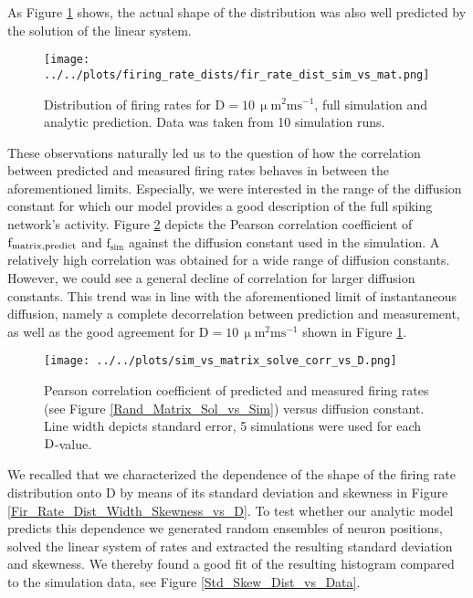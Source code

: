 \documentclass[10pt,a4paper]{article}
\begin{document}
As Figure \ref{Fir_Rate_Dist_Sim_vs_Mat} shows, the actual shape of the distribution was also well predicted by the solution of the linear system.
\begin{figure}
\begin{center}
\texttt{[image: ../../plots/firing\_rate\_dists/fir\_rate\_dist\_sim\_vs\_mat.png]}
\end{center}
\caption[Distribution of firing rates, full simulation and analytic prediction]{Distribution of firing rates for $\mathrm{D=10\, \upmu m^2 ms^{-1}}$, full simulation and analytic prediction. Data was taken from 10 simulation runs.}
\label{Fir_Rate_Dist_Sim_vs_Mat}
\end{figure}
These observations naturally led us to the question of how the correlation between predicted and measured firing rates behaves in between the aforementioned limits. Especially, we were interested in the range of the diffusion constant for which our model provides a good description of the full spiking network's activity. Figure \ref{Corr_Coeff_vs_D} depicts the Pearson correlation coefficient of $\mathrm{f_{matrix \\, predict}}$ and $\mathrm{f_{sim}}$ against the diffusion constant used in the simulation. A relatively high correlation was obtained for a wide range of diffusion constants. However, we could see a general decline of correlation for larger diffusion constants. This trend was in line with the aforementioned limit of instantaneous diffusion, namely a complete decorrelation between prediction and measurement, as well as the good agreement for $\mathrm{D= 10\, \upmu m^2 ms^{-1}}$ shown in Figure \ref{Fir_Rate_Dist_Sim_vs_Mat}.
\begin{figure}
\begin{center}
\texttt{[image: ../../plots/sim\_vs\_matrix\_solve\_corr\_vs\_D.png]}
\end{center}
\caption[Pearson correlation coefficient of predicted and measured firing rates]{Pearson correlation coefficient of predicted and measured firing rates (see Figure \ref{Rand_Matrix_Sol_vs_Sim}) versus diffusion constant. Line width depicts standard error, 5 simulations were used for each $\rm D$-value.}
\label{Corr_Coeff_vs_D}
\end{figure}
We recalled that we characterized the dependence of the shape of the firing rate distribution onto $\mathrm{D}$ by means of its standard deviation and skewness in Figure \ref{Fir_Rate_Dist_Width_Skewness_vs_D}. To test whether our analytic model predicts this dependence we generated random ensembles of neuron positions, solved the linear system of rates and extracted the resulting standard deviation and skewness. We thereby found a good fit of the resulting histogram compared to the simulation data, see Figure \ref{Std_Skew_Dist_vs_Data}.
\end{document}
